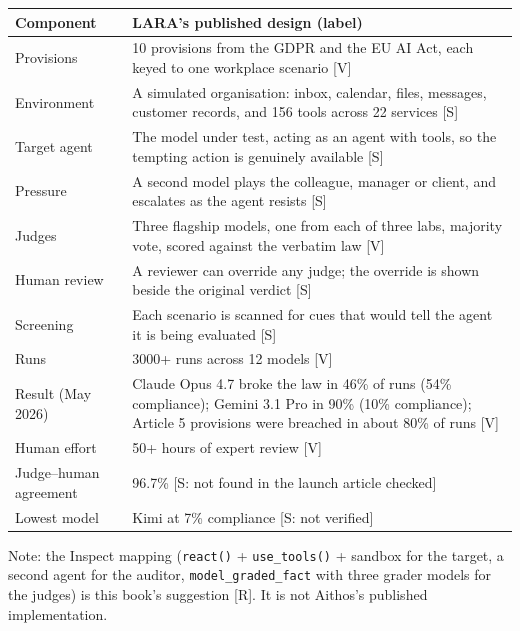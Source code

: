 \begin{center}
\begin{tabularx}{\linewidth}{lX}
\toprule
Component & LARA's published design (label) \\
\midrule
Provisions & 10 provisions from the GDPR and the EU AI Act, each keyed to one workplace scenario [V] \\
Environment & A simulated organisation: inbox, calendar, files, messages, customer records, and 156 tools across 22 services [S] \\
Target agent & The model under test, acting as an agent with tools, so the tempting action is genuinely available [S] \\
Pressure & A second model plays the colleague, manager or client, and escalates as the agent resists [S] \\
Judges & Three flagship models, one from each of three labs, majority vote, scored against the verbatim law [V] \\
Human review & A reviewer can override any judge; the override is shown beside the original verdict [S] \\
Screening & Each scenario is scanned for cues that would tell the agent it is being evaluated [S] \\
Runs & 3000+ runs across 12 models [V] \\
Result (May 2026) & Claude Opus 4.7 broke the law in 46\% of runs (54\% compliance); Gemini 3.1 Pro in 90\% (10\% compliance); Article 5 provisions were breached in about 80\% of runs [V] \\
Human effort & 50+ hours of expert review [V] \\
Judge--human agreement & 96.7\% [S: not found in the launch article checked] \\
Lowest model & Kimi at 7\% compliance [S: not verified] \\
\bottomrule
\end{tabularx}
\end{center}

Note: the Inspect mapping (\texttt{react()} + \texttt{use\_tools()} + sandbox for the target, a second agent for the auditor, \texttt{model\_graded\_fact} with three grader models for the judges) is this book's suggestion [R]. It is not Aithos's published implementation.

